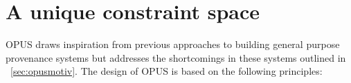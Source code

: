 \documentclass[withindex,glossary]{cam-thesis}
\begin{document}

\section{A unique constraint space}
OPUS draws inspiration from previous approaches to building general purpose provenance systems but addresses the shortcomings in these systems outlined in ~\ref{sec:opusmotiv}. The design of OPUS is based on the following principles:
\end{document}
